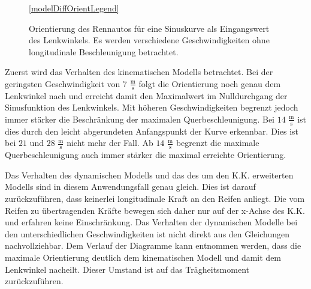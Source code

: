 \documentclass{like}
\begin{document}
\begin{figure}
	\centering
	\subfigure{
		 
	}%
	\subfigure{
		 
	}	
	
	\ref{modelDiffOrientLegend}
	\caption{Orientierung des Rennautos für eine Sinuskurve als Eingangswert des Lenkwinkels. Es werden verschiedene Geschwindigkeiten ohne longitudinale Beschleunigung betrachtet.}\label{fig:modelDiffOrient}
\end{figure}

Zuerst wird das Verhalten des kinematischen Modells betrachtet. Bei der geringsten Geschwindigkeit von $7$ $\frac{\text{m}}{\text{s}}$ folgt die Orientierung noch genau dem Lenkwinkel nach und erreicht damit den Maximalwert im Nulldurchgang der Sinusfunktion des Lenkwinkels. Mit höheren Geschwindigkeiten begrenzt jedoch immer stärker die Beschränkung der maximalen Querbeschleunigung. Bei $14$ $\frac{\text{m}}{\text{s}}$ ist dies durch den leicht abgerundeten An\-fangs\-punkt der Kurve erkennbar. Dies ist bei $21$ und $28$ $\frac{\text{m}}{\text{s}}$ nicht mehr der Fall. Ab  $14$ $\frac{\text{m}}{\text{s}}$ begrenzt die maximale Querbeschleunigung auch immer stärker die maximal erreichte Orientierung. 

Das Verhalten des dynamischen Modells und das des um den \ac{K.K.} erweiterten Modells sind in diesem Anwendungsfall genau gleich. Dies ist darauf zurückzuführen, dass keinerlei longitudinale Kraft an den Reifen anliegt. Die vom Reifen zu übertragenden Kräfte bewegen sich daher nur auf der x-Achse des \ac{K.K.} und erfahren keine Einschränkung. 
Das Verhalten der dynamischen Modelle bei den unterschiedlichen Geschwindigkeiten ist nicht direkt aus den Gleichungen nachvollziehbar.
Dem Verlauf der Diagramme kann entnommen werden, dass die maximale Orientierung deutlich dem kinematischen Modell und damit dem Lenkwinkel nacheilt. Dieser Umstand ist auf das Trägheitsmoment zurückzuführen.
\end{document}
